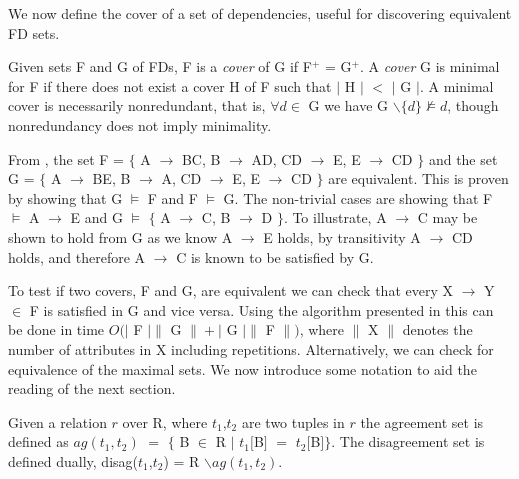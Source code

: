 We now define the cover of a set of dependencies, useful for
discovering equivalent FD sets.


\begin{definition}
\begin{rm}
Given sets F and G of FDs, F is a {\em cover} of G
if F$^+$ = G$^+$. A {\em cover} G is minimal for F if there does not
exist a cover H of F such that $\mid$ H $\mid$ $<$ $\mid$ G $\mid$. A
minimal cover is necessarily nonredundant,  
that is, $\forall d \in$ G we have  G $\backslash \{ d \} \not\models
d$, though nonredundancy does not imply minimality. 
\end{rm}
\end{definition}

\begin{example}
\begin{rm}
From \cite{mr92}, the set F = $\{$ A $\to$ BC, B $\to$ AD, CD $\to$ E,
E $\to$ CD $\}$ and the set  G = $\{$ A $\to$ BE, B $\to$ A, CD $\to$
E, E $\to$ CD $\}$ are equivalent. This is proven by showing that G
$\models$ F and F $\models$ G.  The non-trivial 
cases are showing that F $\models$ A $\to$ E and G $\models$ $\{$ A
$\to$ C, B $\to$ D $\}$. To illustrate, A $\to$ C may be shown to hold
from G as we know A $\to$ E holds, by transitivity A $\to$ CD
holds, and therefore A $\to$ C is known to be satisfied by G. 
\end{rm}
\end{example}

To test if two covers, F and G, are equivalent we can check that
every X $\to$ Y $\in$ F is satisfied in G and vice versa.  Using the
algorithm presented in \cite{mr92} this can be done in time $O( \mid$ F
$\mid \|$ G $\| + \mid$ G $\mid \|$ F $\|)$, where $\|$ X $\|$ denotes
the number of attributes in X including repetitions. Alternatively, we
can check for 
equivalence of the maximal sets. We now introduce some notation to aid
the reading of the next section.
\begin{definition}
\begin{rm}
Given a relation $r$ over R, where $t_1$,$t_2$ are
two tuples in $r$ the agreement set is defined as
$ag(t_1, t_2)$ $=$ $\{$ B $\in$ R $\mid$ $t_1[$B$]$ $=$
$t_2[$B$]$$\}$. \newline 
The disagreement set is defined dually, disag($t_1$,$t_2$) = R
$\backslash ag(t_1, t_2) $.
\end{rm}
\end{definition}

